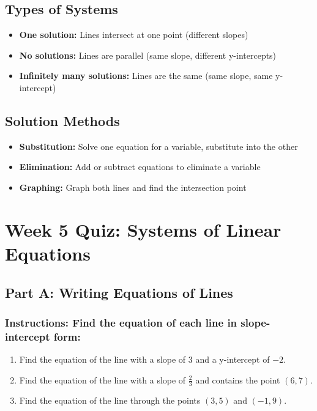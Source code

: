 \documentclass[12pt]{article}
\begin{document}
        \subsection*{Types of Systems}
            \begin{itemize}
                \item \textbf{One solution:} Lines intersect at one point (different slopes)
                \item \textbf{No solutions:} Lines are parallel (same slope, different y-intercepts)
                \item \textbf{Infinitely many solutions:} Lines are the same (same slope, same y-intercept)
            \end{itemize}

        \subsection*{Solution Methods}
            \begin{itemize}
                \item \textbf{Substitution:} Solve one equation for a variable, substitute into the other
                \item \textbf{Elimination:} Add or subtract equations to eliminate a variable
                \item \textbf{Graphing:} Graph both lines and find the intersection point
            \end{itemize}

            \newpage

    \section*{Week 5 Quiz: Systems of Linear Equations}
	
        \subsection*{Part A: Writing Equations of Lines}
            
            \subsubsection*{Instructions: Find the equation of each line in slope-intercept form:}

                \begin{enumerate}
                    \item Find the equation of the line with a slope of 3 and a y-intercept of $-2$.
                    \item Find the equation of the line with a slope of $\frac{2}{3}$ and contains the point $(6, 7)$.
                    \item Find the equation of the line through the points $(3, 5)$ and $(-1, 9)$.
                \end{enumerate}
        
\end{document}

